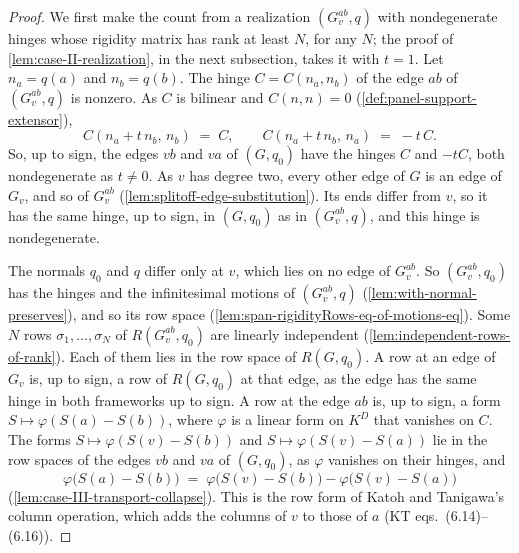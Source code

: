 \begin{proof}
  \leanok
  We first make the count from a realization $(G_v^{ab}, q)$ with
  nondegenerate hinges whose rigidity matrix has rank at least $N$, for
  any $N$; the proof of \cref{lem:case-II-realization}, in the next
  subsection, takes it with $t = 1$. Let $n_a = q(a)$ and $n_b = q(b)$.
  The hinge $C = C(n_a, n_b)$ of the edge $ab$ of $(G_v^{ab}, q)$ is
  nonzero. As $C$ is bilinear and $C(n,n) = 0$
  (\cref{def:panel-support-extensor}),
  \[
    C(n_a + t\,n_b,\, n_b) \;=\; C,
    \qquad
    C(n_a + t\,n_b,\, n_a) \;=\; -t\,C.
  \]
  So, up to sign, the edges $vb$ and $va$ of $(G, q_0)$ have the hinges
  $C$ and $-tC$, both nondegenerate as $t \neq 0$. As $v$ has degree
  two, every other edge of $G$ is an edge of $G_v$, and so of $G_v^{ab}$
  (\cref{lem:splitoff-edge-substitution}). Its ends differ from $v$, so
  it has the same hinge, up to sign, in $(G, q_0)$ as in
  $(G_v^{ab}, q)$, and this hinge is nondegenerate.

  The normals $q_0$ and $q$ differ only at $v$, which lies on no edge of
  $G_v^{ab}$. So $(G_v^{ab}, q_0)$ has the hinges and the infinitesimal
  motions of $(G_v^{ab}, q)$ (\cref{lem:with-normal-preserves}), and so
  its row space (\cref{lem:span-rigidityRows-eq-of-motions-eq}). Some $N$
  rows $\sigma_1, \dots, \sigma_N$ of $R(G_v^{ab}, q_0)$ are linearly
  independent (\cref{lem:independent-rows-of-rank}). Each of them lies in
  the row space of $R(G, q_0)$. A row at an edge of $G_v$ is, up to
  sign, a row of $R(G, q_0)$ at that edge, as the edge has the same hinge
  in both frameworks up to sign. A row at the edge $ab$ is, up to sign, a
  form $S \mapsto \varphi(S(a) - S(b))$, where $\varphi$ is a linear form
  on $K^D$ that vanishes on $C$. The forms
  $S \mapsto \varphi(S(v) - S(b))$ and $S \mapsto \varphi(S(v) - S(a))$
  lie in the row spaces of the edges $vb$ and $va$ of $(G, q_0)$, as
  $\varphi$ vanishes on their hinges, and
  \[
    \varphi\bigl(S(a) - S(b)\bigr) \;=\;
      \varphi\bigl(S(v) - S(b)\bigr) - \varphi\bigl(S(v) - S(a)\bigr)
  \]
  (\cref{lem:case-III-transport-collapse}). This is the row form of Katoh
  and Tanigawa's column operation, which adds the columns of $v$ to those
  of $a$ (KT eqs.~(6.14)--(6.16)).


\end{proof}
